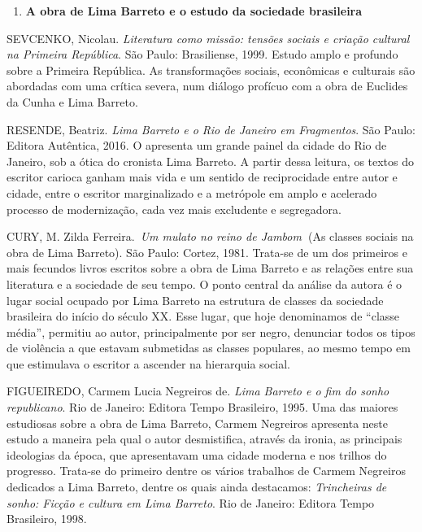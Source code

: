 \begin{enumerate}
\def\labelenumi{\arabic{enumi})}
\setcounter{enumi}{1}
\item
  \textbf{A obra de Lima Barreto e o estudo da sociedade brasileira}
\end{enumerate}

SEVCENKO, Nicolau. \emph{Literatura como missão: tensões sociais e
criação cultural na Primeira República}. São Paulo: Brasiliense, 1999.
Estudo amplo e profundo sobre a Primeira República. As transformações
sociais, econômicas e culturais são abordadas com uma crítica severa,
num diálogo profícuo com a obra de Euclides da Cunha e Lima Barreto.

RESENDE, Beatriz. \emph{Lima Barreto e o Rio de Janeiro em Fragmentos}.
São Paulo: Editora Autêntica, 2016. O apresenta um grande painel da
cidade do Rio de Janeiro, sob a ótica do cronista Lima Barreto. A partir
dessa leitura, os textos do escritor carioca ganham mais vida e um
sentido de reciprocidade entre autor e cidade, entre o escritor
marginalizado e a metrópole em amplo e acelerado processo de
modernização, cada vez mais excludente e segregadora.

CURY, M. Zilda Ferreira.~\emph{Um mulato no reino de
Jambom}\textbf{~}(As classes sociais na obra de Lima Barreto). São
Paulo: Cortez, 1981. Trata-se de um dos primeiros e mais fecundos livros
escritos sobre a obra de Lima Barreto e as relações entre sua literatura
e a sociedade de seu tempo. O ponto central da análise da autora é o
lugar social ocupado por Lima Barreto na estrutura de classes da
sociedade brasileira do início do século XX. Esse lugar, que hoje
denominamos de ``classe média'', permitiu ao autor, principalmente por
ser negro, denunciar todos os tipos de violência a que estavam
submetidas as classes populares, ao mesmo tempo em que estimulava o
escritor a ascender na hierarquia social.

FIGUEIREDO, Carmem Lucia Negreiros de. \emph{Lima Barreto e o fim do
sonho republicano}. Rio de Janeiro: Editora Tempo Brasileiro, 1995. Uma
das maiores estudiosas sobre a obra de Lima Barreto, Carmem Negreiros
apresenta neste estudo a maneira pela qual o autor desmistifica, através
da ironia, as principais ideologias da época, que apresentavam uma
cidade moderna e nos trilhos do progresso. Trata-se do primeiro dentre
os vários trabalhos de Carmem Negreiros dedicados a Lima Barreto, dentre
os quais ainda destacamos: \emph{Trincheiras de sonho: Ficção e cultura
em Lima Barreto}. Rio de Janeiro: Editora Tempo Brasileiro, 1998.

